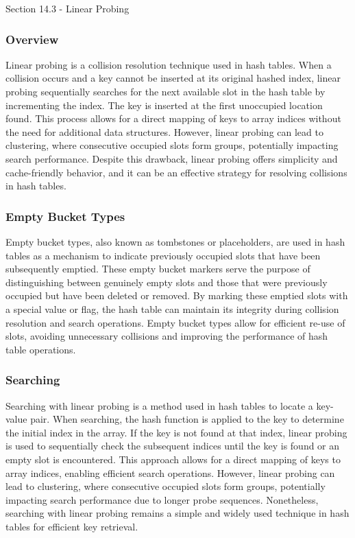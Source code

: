 \begin{notes}{Section 14.3 - Linear Probing}
    \subsubsection*{Overview}

    Linear probing is a collision resolution technique used in hash tables. When a collision occurs and a key cannot be inserted at its original hashed index, linear probing sequentially searches for the next available slot in 
    the hash table by incrementing the index. The key is inserted at the first unoccupied location found. This process allows for a direct mapping of keys to array indices without the need for additional data structures. However, 
    linear probing can lead to clustering, where consecutive occupied slots form groups, potentially impacting search performance. Despite this drawback, linear probing offers simplicity and cache-friendly behavior, and it can be 
    an effective strategy for resolving collisions in hash tables.
    
    \subsubsection*{Empty Bucket Types}
    
    Empty bucket types, also known as tombstones or placeholders, are used in hash tables as a mechanism to indicate previously occupied slots that have been subsequently emptied. These empty bucket markers serve the purpose of 
    distinguishing between genuinely empty slots and those that were previously occupied but have been deleted or removed. By marking these emptied slots with a special value or flag, the hash table can maintain its integrity 
    during collision resolution and search operations. Empty bucket types allow for efficient re-use of slots, avoiding unnecessary collisions and improving the performance of hash table operations.
    
    \subsubsection*{Searching}
    
    Searching with linear probing is a method used in hash tables to locate a key-value pair. When searching, the hash function is applied to the key to determine the initial index in the array. If the key is not found at that 
    index, linear probing is used to sequentially check the subsequent indices until the key is found or an empty slot is encountered. This approach allows for a direct mapping of keys to array indices, enabling efficient search 
    operations. However, linear probing can lead to clustering, where consecutive occupied slots form groups, potentially impacting search performance due to longer probe sequences. Nonetheless, searching with linear probing remains 
    a simple and widely used technique in hash tables for efficient key retrieval.
    

\end{notes}
